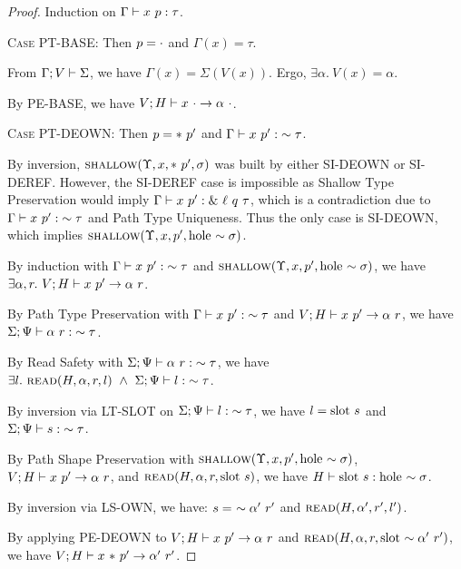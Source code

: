 \documentclass{article}
\begin{document}
\begin{proof}
  Induction on ${{\Gamma}} \vdash {{x}\ {p}} : {{\tau}}$.

  \textsc{Case PT-BASE}: 
    Then $p = \cdot$ and $\Gamma(x) = \tau$.

    From ${\Gamma}; {V} \vdash {\Sigma}$, we have $\Gamma(x) = \Sigma(V(x))$.
    Ergo, $\exists \alpha.\ V(x) = \alpha$.

    By \textsc{PE-BASE}, we have ${{V};{H}} \vdash {{x}\ {\cdot}} \rightarrow {{\alpha}\ {\cdot}}$.

  \textsc{Case PT-DEOWN}:
    Then $p = *\ {p'}$ and ${{\Gamma}} \vdash {{x}\ {p'}} : {{\sim {\tau}}}$.

    By inversion, $\textsc{shallow}({\Upsilon},{x},{*\ {p'}},{\sigma})$ was built by either
    \textsc{SI-DEOWN} or \textsc{SI-DEREF}. However, the \textsc{SI-DEREF} case is
    impossible as Shallow Type Preservation would imply
    ${{\Gamma}} \vdash {{x}\ {p'}} : {{\&\ {\ell}\ {q}\ {\tau}}}$, which is a contradiction due to
    ${{\Gamma}} \vdash {{x}\ {p'}} : {{\sim {\tau}}}$ and Path Type Uniqueness.
    Thus the only case is \textsc{SI-DEOWN}, which implies
    $\textsc{shallow}({\Upsilon},{x},{p'},{\textrm{hole}\ {\sim {\sigma}}})$.

    By induction with ${{\Gamma}} \vdash {{x}\ {p'}} : {{\sim {\tau}}}$ and
    $\textsc{shallow}({\Upsilon},{x},{p'},{\textrm{hole}\ {\sim {\sigma}}})$, we have
    $\exists \alpha, r.\ \PEval{V}{H}{x}{p'}{\alpha}{r}$.

    By Path Type Preservation with ${{\Gamma}} \vdash {{x}\ {p'}} : {{\sim {\tau}}}$ and
    ${{V};{H}} \vdash {{x}\ {p'}} \rightarrow {{\alpha}\ {r}}$, we have ${{{\Sigma}} ;{{\Psi}}} \vdash {{{\alpha}\ {r}}} : {{{\sim {\tau}}}}$.

    By Read Safety with ${{{\Sigma}} ;{{\Psi}}} \vdash {{{\alpha}\ {r}}} : {{{\sim {\tau}}}}$, we have
    $\exists l.\ \Read{H}{\alpha}{r}{l}\ \land\ \RTType{\Sigma}{\Psi}{l}{\Own{\tau}}$.

    By inversion via \textsc{LT-SLOT} on ${{\Sigma} ;{\Psi}} \vdash {{l}} : {{\sim {\tau}}}$,
    we have $l = \textrm{slot}\ {s}$ and ${{\Sigma} ;{\Psi}} \vdash {{s}} : {{\sim {\tau}}}$.

    By Path Shape Preservation with $\textsc{shallow}({\Upsilon},{x},{p'},{\textrm{hole}\ {\sim {\sigma}}})$,
    ${{V};{H}} \vdash {{x}\ {p'}} \rightarrow {{\alpha}\ {r}}$, and $\textsc{read}({H},{\alpha},{r},{\textrm{slot}\ {s}})$, we have
    ${H} \vdash {\textrm{slot}\ {s}} : {\textrm{hole}\ {\sim {\sigma}}}$.

    By inversion via \textsc{LS-OWN}, we have: $s =\ \sim {{\alpha'}\ {r'}}$ and
    $\textsc{read}({H},{\alpha'},{r'},{l'})$.

    By applying \textsc{PE-DEOWN} to ${{V};{H}} \vdash {{x}\ {p'}} \rightarrow {{\alpha}\ {r}}$ and
    $\textsc{read}({H},{\alpha},{r},{\textrm{slot}\ {\sim {{\alpha'}\ {r'}}}})$, we have
    ${{V};{H}} \vdash {{x}\ {*\ {p'}}} \rightarrow {{\alpha'}\ {r'}}$.


\end{proof}
\end{document}
